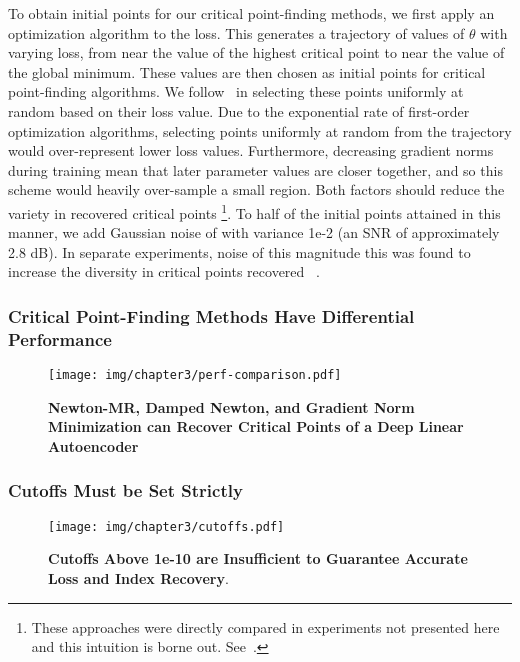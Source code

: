 \documentclass[../../thesis.tex]{subfiles}
\begin{document}
To obtain initial points for our critical point-finding methods,
we first apply an optimization algorithm to the loss.
This generates a trajectory of values of $\theta$ with varying loss,
from near the value of the highest critical point
to near the value of the global minimum.
These values are then chosen as initial points
for critical point-finding algorithms.
We follow~\cite{pennington2017} in selecting these points
uniformly at random based on their loss value.
Due to the exponential rate of first-order optimization algorithms,
selecting points uniformly at random from the trajectory
would over-represent lower loss values.
Furthermore, decreasing gradient norms during training mean that
later parameter values are closer together,
and so this scheme would heavily over-sample a small region.
Both factors should reduce the variety in recovered critical points%
\footnote{These approaches were directly compared in
experiments not presented here and this intuition is borne out.
See~\cite{frye2019}.}.
To half of the initial points attained in this manner,
we add Gaussian noise of with variance 1e-2%
(an SNR of approximately 2.8 dB).
In separate experiments,
noise of this magnitude
this was found to increase
the diversity in critical points recovered%
~\cite{frye2019}.

\subsubsection{Critical Point-Finding Methods Have Differential Performance}%

\begin{figure}[h]
	\begin{center}
		\texttt{[image: img/chapter3/perf-comparison.pdf]}
	\end{center}
	\caption{\textbf{Newton-MR, Damped Newton, and Gradient Norm Minimization
	can Recover Critical Points of a Deep Linear Autoencoder}}
\end{figure}

\subsubsection{Cutoffs Must be Set Strictly}%

\begin{figure}[h]
	\begin{center}
		\texttt{[image: img/chapter3/cutoffs.pdf]}
	\end{center}
	\caption{\textbf{Cutoffs Above 1e-10 are Insufficient to Guarantee
	Accurate Loss and Index Recovery}.}
\end{figure}
\end{document}
